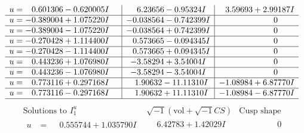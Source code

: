 \documentclass[1p]{elsarticle_modified}
\theoremstyle{definition}
\newcommand{\I}{\sqrt{-1}}
\begin{document}
$$\begin{array}{c|c|c}
\begin{aligned}
u &= \phantom{-}0.601306 - 0.620005 I\end{aligned}
 & \phantom{-}6.23656 - 0.95324 I & \phantom{-}3.59693 + 2.99187 I \\ \hline\begin{aligned}
u &= -0.389004 + 1.075220 I\end{aligned}
 & -0.038564 - 0.742399 I & \phantom{-0.000000 } 0 \\ \hline\begin{aligned}
u &= -0.389004 - 1.075220 I\end{aligned}
 & -0.038564 + 0.742399 I & \phantom{-0.000000 } 0 \\ \hline\begin{aligned}
u &= -0.270428 + 1.114400 I\end{aligned}
 & \phantom{-}0.573665 - 0.094345 I & \phantom{-0.000000 } 0 \\ \hline\begin{aligned}
u &= -0.270428 - 1.114400 I\end{aligned}
 & \phantom{-}0.573665 + 0.094345 I & \phantom{-0.000000 } 0 \\ \hline\begin{aligned}
u &= \phantom{-}0.443236 + 1.076980 I\end{aligned}
 & -3.58294 + 3.54004 I & \phantom{-0.000000 } 0 \\ \hline\begin{aligned}
u &= \phantom{-}0.443236 - 1.076980 I\end{aligned}
 & -3.58294 - 3.54004 I & \phantom{-0.000000 } 0 \\ \hline\begin{aligned}
u &= \phantom{-}0.773116 + 0.297168 I\end{aligned}
 & \phantom{-}1.90632 - 11.11310 I & -1.08984 + 6.87770 I \\ \hline\begin{aligned}
u &= \phantom{-}0.773116 - 0.297168 I\end{aligned}
 & \phantom{-}1.90632 + 11.11310 I & -1.08984 - 6.87770 I\\
 \hline 
 \end{array}$$\newpage$$\begin{array}{c|c|c}  
\text{Solutions to }I^u_{1}& \I (\text{vol} + \sqrt{-1}CS) & \text{Cusp shape}\\
 \hline 
\begin{aligned}
u &= \phantom{-}0.555744 + 1.035790 I\end{aligned}
 & \phantom{-}6.42783 + 1.42029 I & \phantom{-0.000000 } 0 \\ \hline\begin{aligned}

\end{aligned}
\end{array}$$
\end{document}
